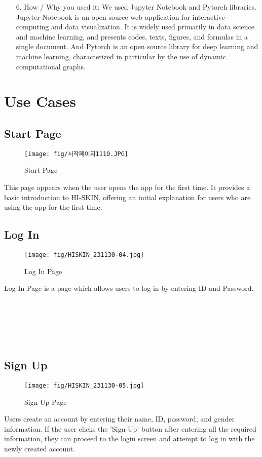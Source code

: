 \documentclass[conference]{IEEEtran}
\begin{document}
\begin{itemize}
    \item[6.] How / Why you used it: We used Jupyter Notebook and Pytorch libraries. Jupyter Notebook is an open source web application for interactive computing and data visualization. It is widely used primarily in data science and machine learning, and presents codes, texts, figures, and formulas in a single document. And Pytorch is an open source library for deep learning and machine learning, characterized in particular by the use of dynamic computational graphs.

\end{itemize}
\clearpage

\section{Use Cases}
\subsection{Start Page}
\begin{figure}[h]
    \centering
    \texttt{[image: fig/시작페이지1110.JPG]}
    \label{fig:Start Page}
    \caption{Start Page} 
    \end{figure}
This page appears when the user opens the app for the first time. It provides a basic introduction to HI-SKIN, offering an initial explanation for users who are using the app for the first time.

\subsection{Log In}
 \begin{figure}[h]
    \centering
    \texttt{[image: fig/HISKIN\_231130-04.jpg]}
    \label{fig:Log In Page}
    \caption{Log In Page} 
    \end{figure}
Log In Page is a page which allows users to log in by entering ID and Password. \\ \\ \\ \\ \\ \\

\subsection{Sign Up}
\begin{figure}[h]
    \centering
    \texttt{[image: fig/HISKIN\_231130-05.jpg]}
    \label{fig:Sign Up Page}
    \caption{Sign Up Page} 
    \end{figure}
Users create an account by entering their name, ID, password, and gender information. If the user clicks the 'Sign Up' button after entering all the required information, they can proceed to the login screen and attempt to log in with the newly created account. \\
\end{document}
